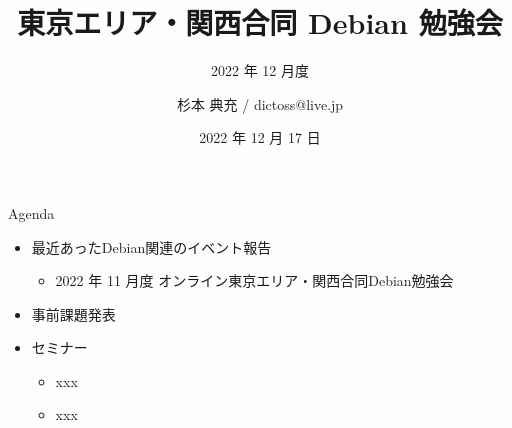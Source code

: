 \title{東京エリア・関西合同 Debian 勉強会}
\subtitle{2022 年 12 月度} %
\author{杉本 典充 / dictoss@live.jp}
\date{2022 年 12 月 17 日}



\begin{frame}
\titlepage{}
\end{frame}

\begin{frame}{Agenda}
 \begin{minipage}[t]{0.45\hsize}
  \begin{itemize}
  \item 最近あったDebian関連のイベント報告
    \begin{itemize}
    \item 2022 年 11 月度 オンライン東京エリア・関西合同Debian勉強会
    \end{itemize}
  \item 事前課題発表
  \end{itemize}
 \end{minipage}
 \begin{minipage}[t]{0.45\hsize}
   \begin{itemize}
   \item セミナー
     \begin{itemize}
     \item xxx
     \item xxx
     \end{itemize}
  \end{itemize}
 \end{minipage}
\end{frame}

